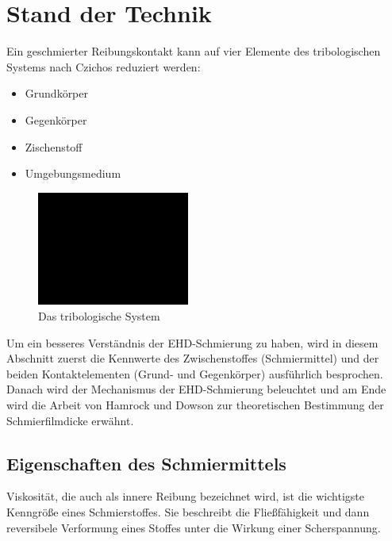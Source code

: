 \chapter{Stand der Technik}
\label{chap:stand_der_technik}

Ein geschmierter Reibungskontakt kann auf vier Elemente des tribologischen Systems nach Czichos \cite{czihos} reduziert werden:
\begin{itemize}
    \item Grundkörper
    \item Gegenkörper
    \item Zischenstoff
    \item Umgebungsmedium
\end{itemize}

\begin{figure}[htb]
    \centering
    \includegraphics[width=5cm]{./images/blank_img.jpg}
    \caption{Das tribologische System}
    \label{fig:das_tribologische_system}
\end{figure}

Um ein besseres Verständnis der EHD-Schmierung zu haben, wird in diesem Abschnitt zuerst die Kennwerte des Zwischenstoffes (Schmiermittel) und der beiden Kontaktelementen (Grund- und Gegenkörper) ausführlich besprochen.
Danach wird der Mechanismus der EHD-Schmierung beleuchtet und am Ende wird die Arbeit von Hamrock und Dowson zur theoretischen Bestimmung der Schmierfilmdicke erwähnt.

\section{Eigenschaften des Schmiermittels}
\label{sec:eigenschaften_des_schmiermittels}
Viskosität, die auch als innere Reibung bezeichnet wird, ist die wichtigste Kenngröße eines Schmierstoffes.
Sie beschreibt die Fließfähigkeit und dann reversibele Verformung eines Stoffes unter die Wirkung einer Scherspannung.

